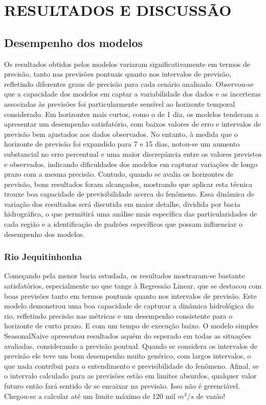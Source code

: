 \chapter{RESULTADOS E DISCUSS\~AO}
\label{cap:capitulo4}

\section{Desempenho dos modelos}

Os resultados obtidos pelos modelos variaram significativamente em termos de precisão, tanto nas previsões pontuais quanto nos intervalos de previsão, refletindo diferentes graus de precisão para cada cenário analisado. Observou-se que a capacidade dos modelos em captar a variabilidade dos dados e as incertezas associadas às previsões foi particularmente sensível ao horizonte temporal considerado. Em horizontes mais curtos, como o de 1 dia, os modelos tenderam a apresentar um desempenho satisfatório, com baixos valores de erro e intervalos de previsão bem ajustados aos dados observados. No entanto, à medida que o horizonte de previsão foi expandido para 7 e 15 dias, notou-se um aumento substancial no erro percentual e uma maior discrepância entre os valores previstos e observados, indicando dificuldades dos modelos em capturar variações de longo prazo com a mesma precisão. Contudo, quando se avalia os horizontes de previsão, bons resultados foram alcançados, mostrando que aplicar esta técnica trouxe boa capacidade de previsibilidade acerca do fenômeno. Essa dinâmica de variação dos resultados será discutida em maior detalhe, dividida por bacia hidrográfica, o que permitirá uma análise mais específica das particularidades de cada região e a identificação de padrões específicos que possam influenciar o desempenho dos modelos.

\subsection{Rio Jequitinhonha}

Começando pela menor bacia estudada, os resultados mostraram-se bastante satisfatórios, especialmente no que tange à Regressão Linear, que se destacou com boas previsões tanto em termos pontuais quanto nos intervalos de previsão. Este modelo demonstrou uma boa capacidade de capturar a dinâmica hidrológica do rio, refletindo precisão nas métricas e um desempenho consistente para o horizonte de curto prazo. E com um tempo de execução baixo. O modelo simples SeasonalNaive apresentou resultados aquém do esperado em todas as situações avaliadas, considerando a previsão pontual. Quando se considera os intervalos de previsão ele teve um bom desempenho muito genérico, com largos intervalos, o que nada contribui para o entendimento e previsibilidade do fenômeno. Afinal, se o intervalo calculado para as previsões estão em limites absurdos, qualquer valor futuro então fará sentido de se encaixar na previsão. Isso não é gerenciável. Chegou-se a calcular até um limite máximo de 120 mil $m^3/s$ de vazão!


